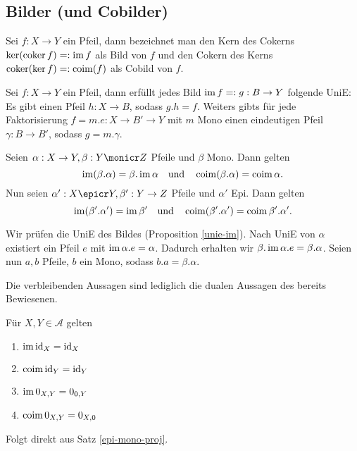 \subsection{Bilder (und Cobilder)}

\begin{defn}
Sei $f : X\to Y$ ein Pfeil, dann bezeichnet man den Kern des Cokerns $\ker(\operatorname{coker} f) =: \operatorname{im} f$ als Bild von $f$
und den Cokern des Kerns $\operatorname{coker}(\ker f) =: \operatorname{coim}(f)$ als Cobild von $f$.
\end{defn}

\begin{prop}\label{unie-im}
Sei $f:X\to Y$ ein Pfeil, dann erfüllt jedes Bild $\operatorname{im} f =: g : B \to Y$ folgende UniE:
Es gibt einen Pfeil $h : X \to B$, sodass $g.h = f$. Weiters gibts für jede Faktorisierung $f = m . e : X \to B' \to Y$ mit $m$ Mono einen eindeutigen Pfeil $\gamma : B \to B'$, sodass $g = m.\gamma$.
\end{prop}

\begin{satz}\label{epi-mono-proj}
Seien $\alpha : X \to Y, \beta : Y \monicr Z$ Pfeile und $\beta$ Mono.
Dann gelten
\[ \operatorname{im}(\beta.\alpha) = \beta.\operatorname{im} \alpha
\quad\text{und}\quad
\operatorname{coim}(\beta.\alpha) = \operatorname{coim} \alpha.\]
Nun seien $\alpha' : X \epicr Y, \beta' : Y \to Z$ Pfeile und $\alpha'$ Epi.
Dann gelten
\[ \operatorname{im}(\beta'.\alpha') = \operatorname{im} \beta'
\quad\text{und}\quad
 \operatorname{coim}(\beta'.\alpha') = \operatorname{coim} \beta'.\alpha'.\]
\end{satz}
\begin{bew}
Wir prüfen die UniE des Bildes (Proposition \ref{unie-im}).
Nach UniE von $\alpha$ existiert ein Pfeil $e$ mit $\operatorname{im} \alpha.e = \alpha$.
Dadurch erhalten wir $\beta.\operatorname{im} \alpha.e = \beta.\alpha$.
Seien nun $a,b$ Pfeile, $b$ ein Mono, sodass $b.a = \beta . \alpha$.


Die verbleibenden Aussagen sind lediglich die dualen Aussagen des bereits Bewiesenen.
\end{bew}


\begin{korr}
Für $X,Y \in \mathcal A$ gelten
\begin{enumerate}
\item $\operatorname{im} \operatorname{id}_X = \operatorname{id}_X$
\item $\operatorname{coim} \operatorname{id}_Y = \operatorname{id}_Y$
\item $\operatorname{im} 0_{X,Y} = 0_{0,Y}$
\item $\operatorname{coim} 0_{X,Y} = 0_{X,0}$
\end{enumerate}
\end{korr}
\begin{bew}
Folgt direkt aus Satz \ref{epi-mono-proj}.
\end{bew}

